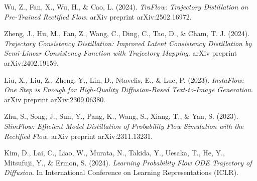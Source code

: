 \documentclass{article}
\begin{document}
\begin{thebibliography}{9}

Wu, Z., Fan, X., Wu, H., \& Cao, L. (2024).
\textit{TraFlow: Trajectory Distillation on Pre-Trained Rectified Flow}.
arXiv preprint arXiv:2502.16972.

Zheng, J., Hu, M., Fan, Z., Wang, C., Ding, C., Tao, D., \& Cham, T. J. (2024).
\textit{Trajectory Consistency Distillation: Improved Latent Consistency Distillation by Semi-Linear Consistency Function with Trajectory Mapping}.
arXiv preprint arXiv:2402.19159.

Liu, X., Liu, Z., Zheng, Y., Lin, D., Ntavelis, E., & Luc, P. (2023).
\textit{InstaFlow: One Step is Enough for High-Quality Diffusion-Based Text-to-Image Generation}.
arXiv preprint arXiv:2309.06380.

Zhu, S., Song, J., Sun, Y., Pang, K., Wang, S., Xiang, T., \& Yan, S. (2023).
\textit{SlimFlow: Efficient Model Distillation of Probability Flow Simulation with the Rectified Flow}.
arXiv preprint arXiv:2311.13231.

Kim, D., Lai, C., Liao, W., Murata, N., Takida, Y., Uesaka, T., He, Y., Mitsufuji, Y., \& Ermon, S. (2024).
\textit{Learning Probability Flow ODE Trajectory of Diffusion}.
In International Conference on Learning Representations (ICLR).

\end{thebibliography}
\end{document}

